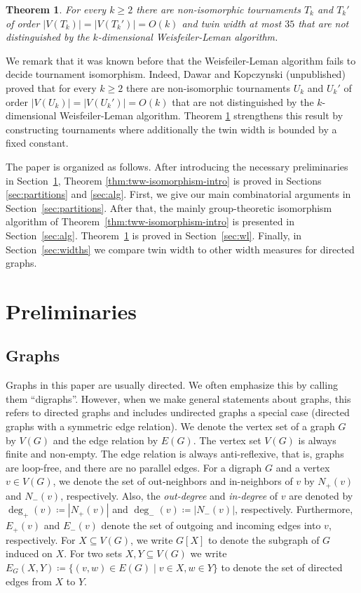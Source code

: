 \PassOptionsToPackage{dvipsnames,svgnames}{xcolor}\documentclass[10pt,a4paper]{article}
\newtheorem{theorem}{Theorem}[section]
\begin{document}
\begin{theorem}
 \label{thm:wl-tournament-tww}
 For every $k \geq 2$ there are non-isomorphic tournaments $T_k$ and $T_k'$ of order $|V(T_k)| = |V(T_k')| = O(k)$ and twin width at most $35$ that are not distinguished by the $k$-dimensional Weisfeiler-Leman algorithm.
\end{theorem}

We remark that it was known before that the Weisfeiler-Leman algorithm fails to decide tournament isomorphism.
Indeed, Dawar and Kopczynski (unpublished) proved that for every $k \geq 2$ there are non-isomorphic tournaments $U_k$ and $U_k'$ of order $|V(U_k)| = |V(U_k')| = O(k)$ that are not distinguished by the $k$-dimensional Weisfeiler-Leman algorithm.
Theorem \ref{thm:wl-tournament-tww} strengthens this result by constructing tournaments where additionally the twin width is bounded by a fixed constant.

The paper is organized as follows.
After introducing the necessary preliminaries in Section~\ref{sec:preliminaries}, Theorem \ref{thm:tww-isomorphism-intro} is proved in Sections \ref{sec:partitions} and \ref{sec:alg}.
First, we give our main combinatorial arguments in Section~\ref{sec:partitions}.
After that, the mainly group-theoretic isomorphism algorithm of Theorem~\ref{thm:tww-isomorphism-intro} is presented in Section~\ref{sec:alg}.
Theorem~\ref{thm:wl-tournament-tww} is proved in Section~\ref{sec:wl}.
Finally, in Section~\ref{sec:widths} we compare twin width to other width measures for directed graphs.


\section{Preliminaries}
\label{sec:preliminaries}

\subsection{Graphs}

Graphs in this paper are usually directed.
We often emphasize this by calling them ``digraphs''.
However, when we make general statements about graphs, this refers to directed graphs and includes undirected graphs a special case (directed graphs with a symmetric edge relation).
We denote the vertex set of a graph $G$ by $V(G)$ and the edge relation by $E(G)$.
The vertex set $V(G)$ is always finite and non-empty.
The edge relation is always anti-reflexive, that is, graphs are loop-free, and there are no parallel edges.
For a digraph $G$ and a vertex $v \in V(G)$, we denote the set of out-neighbors and in-neighbors of $v$ by $N_+(v)$ and $N_-(v)$, respectively.
Also, the \emph{out-degree} and \emph{in-degree} of $v$ are denoted by $\deg_+(v) \coloneqq |N_+(v)|$ and $\deg_-(v) \coloneqq |N_-(v)|$, respectively.
Furthermore, $E_+(v)$ and $E_-(v)$ denote the set of outgoing and incoming edges into $v$, respectively.
For $X\subseteq V(G)$, we write $G[X]$ to denote the subgraph of $G$ induced on $X$.
For two sets $X,Y \subseteq V(G)$ we write $E_G(X,Y) \coloneqq \{(v,w) \in E(G) \mid v \in X, w \in Y\}$ to denote the set of directed edges from $X$ to $Y$.
\end{document}
